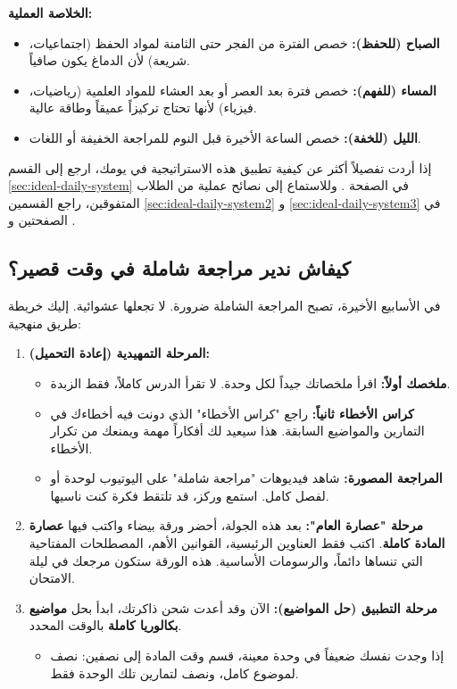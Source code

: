 \documentclass[12pt,a4paper]{book}
\begin{document}
	\textbf{الخلاصة العملية:}
	\begin{itemize}
		\item \textbf{الصباح (للحفظ):} خصص الفترة من الفجر حتى الثامنة لمواد الحفظ (اجتماعيات، شريعة) لأن الدماغ يكون صافياً.
		\item \textbf{المساء (للفهم):} خصص فترة بعد العصر أو بعد العشاء للمواد العلمية (رياضيات، فيزياء) لأنها تحتاج تركيزاً عميقاً وطاقة عالية.
		\item \textbf{الليل (للخفة):} خصص الساعة الأخيرة قبل النوم للمراجعة الخفيفة أو اللغات.
	\end{itemize}
	
	إذا أردت تفصيلاً أكثر عن كيفية تطبيق هذه الاستراتيجية في يومك، ارجع إلى القسم \ref{sec:ideal-daily-system} في الصفحة \pageref{sec:ideal-daily-system}. وللاستماع إلى نصائح عملية من الطلاب المتفوقين، راجع القسمين \ref{sec:ideal-daily-system2} و \ref{sec:ideal-daily-system3} في الصفحتين \pageref{sec:ideal-daily-system2} و \pageref{sec:ideal-daily-system3}.
	
	\subsection*{كيفاش ندير مراجعة شاملة في وقت قصير؟}
	\label{sec:comprehensive-review}
	
	في الأسابيع الأخيرة، تصبح المراجعة الشاملة ضرورة. لا تجعلها عشوائية. إليك خريطة طريق منهجية:
	
	\begin{enumerate}
		\item \textbf{المرحلة التمهيدية (إعادة التحميل):}
		\begin{itemize}
			\item \textbf{ملخصك أولاً:} اقرأ ملخصاتك جيداً لكل وحدة. لا تقرأ الدرس كاملاً، فقط الزبدة.
			\item \textbf{كراس الأخطاء ثانياً:} راجع "كراس الأخطاء" الذي دونت فيه أخطاءك في التمارين والمواضيع السابقة. هذا سيعيد لك أفكاراً مهمة ويمنعك من تكرار الأخطاء.
			\item \textbf{المراجعة المصورة:} شاهد فيديوهات "مراجعة شاملة" على اليوتيوب لوحدة أو لفصل كامل. استمع وركز، قد تلتقط فكرة كنت ناسيها.
		\end{itemize}
		\item \textbf{مرحلة "عصارة العام":}
		بعد هذه الجولة، أحضر ورقة بيضاء واكتب فيها \textbf{عصارة المادة كاملة}. اكتب فقط العناوين الرئيسية، القوانين الأهم، المصطلحات المفتاحية التي تنساها دائماً، والرسومات الأساسية. هذه الورقة ستكون مرجعك في ليلة الامتحان.
		\item \textbf{مرحلة التطبيق (حل المواضيع):}
		الآن وقد أعدت شحن ذاكرتك، ابدأ بحل \textbf{مواضيع بكالوريا كاملة} بالوقت المحدد. 
		\begin{itemize}
			\item إذا وجدت نفسك ضعيفاً في وحدة معينة، قسم وقت المادة إلى نصفين: نصف لموضوع كامل، ونصف لتمارين تلك الوحدة فقط.
		\end{itemize}
	\end{enumerate}
	
\end{document}
